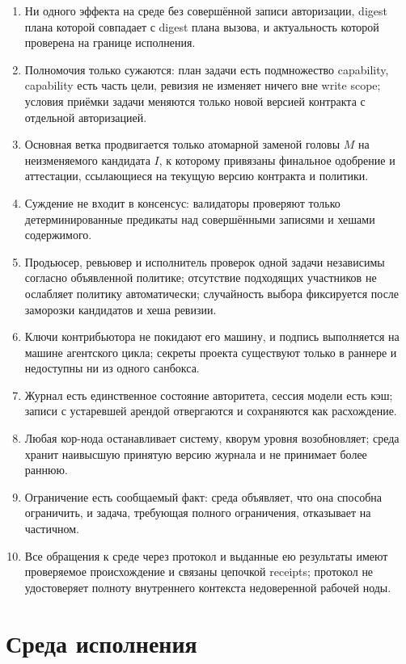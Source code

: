 \documentclass[11pt,a4paper]{article}
\begin{document}
\begin{enumerate}[label=I\arabic*.,leftmargin=2.6em]
\item Ни одного эффекта на среде без совершённой записи авторизации, digest плана которой совпадает с digest плана вызова, и актуальность которой проверена на границе исполнения.
\item Полномочия только сужаются: план задачи есть подмножество capability, capability есть часть цели, ревизия не изменяет ничего вне write scope; условия приёмки задачи меняются только новой версией контракта с отдельной авторизацией.
\item Основная ветка продвигается только атомарной заменой головы $M$ на неизменяемого кандидата $I$, к которому привязаны финальное одобрение и аттестации, ссылающиеся на текущую версию контракта и политики.
\item Суждение не входит в консенсус: валидаторы проверяют только детерминированные предикаты над совершёнными записями и хешами содержимого.
\item Продьюсер, ревьювер и исполнитель проверок одной задачи независимы согласно объявленной политике; отсутствие подходящих участников не ослабляет политику автоматически; случайность выбора фиксируется после заморозки кандидатов и хеша ревизии.
\item Ключи контрибьютора не покидают его машину, и подпись выполняется на машине агентского цикла; секреты проекта существуют только в раннере и недоступны ни из одного санбокса.
\item Журнал есть единственное состояние авторитета, сессия модели есть кэш; записи с устаревшей арендой отвергаются и сохраняются как расхождение.
\item Любая кор-нода останавливает систему, кворум уровня возобновляет; среда хранит наивысшую принятую версию журнала и не принимает более раннюю.
\item Ограничение есть сообщаемый факт: среда объявляет, что она способна ограничить, и задача, требующая полного ограничения, отказывает на частичном.
\item Все обращения к среде через протокол и выданные ею результаты имеют проверяемое происхождение и связаны цепочкой receipts; протокол не удостоверяет полноту внутреннего контекста недоверенной рабочей ноды.
\end{enumerate}

\section{Среда исполнения}
\end{document}

